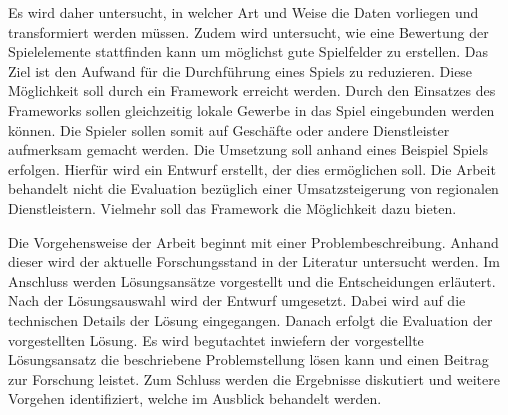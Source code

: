 Es wird daher untersucht, in welcher Art und Weise die Daten vorliegen und transformiert werden müssen.
Zudem wird untersucht, wie eine Bewertung der Spielelemente stattfinden kann um möglichst gute Spielfelder zu erstellen.
Das Ziel ist den Aufwand für die Durchführung eines Spiels zu reduzieren. Diese Möglichkeit soll durch ein Framework erreicht werden. Durch den Einsatzes des Frameworks sollen gleichzeitig lokale Gewerbe in das Spiel eingebunden werden können. Die Spieler sollen somit auf Geschäfte oder andere Dienstleister aufmerksam gemacht werden.
Die Umsetzung soll anhand eines Beispiel Spiels erfolgen.
Hierfür wird ein Entwurf erstellt, der dies ermöglichen soll.
Die Arbeit behandelt nicht die Evaluation bezüglich einer Umsatzsteigerung von regionalen Dienstleistern. Vielmehr soll das Framework die Möglichkeit dazu bieten.

Die Vorgehensweise der Arbeit beginnt mit einer Problembeschreibung. Anhand dieser wird der aktuelle Forschungsstand in der Literatur untersucht werden.
Im Anschluss werden Lösungsansätze vorgestellt und die Entscheidungen erläutert. Nach der Lösungsauswahl wird der Entwurf umgesetzt.
Dabei wird auf die technischen Details der Lösung eingegangen. Danach erfolgt die Evaluation der vorgestellten Lösung.
Es wird begutachtet inwiefern der vorgestellte Lösungsansatz die beschriebene Problemstellung lösen kann und einen Beitrag zur Forschung leistet.
Zum Schluss werden die Ergebnisse diskutiert und weitere Vorgehen identifiziert, welche im Ausblick behandelt werden.

